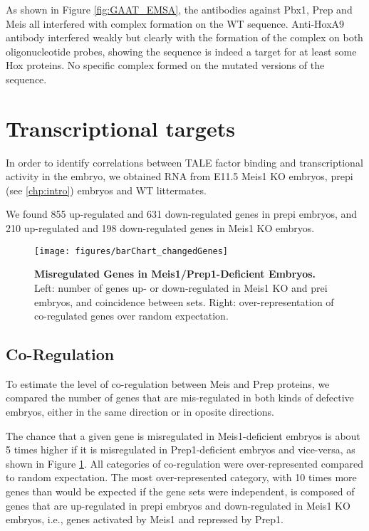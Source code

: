 As shown in Figure \ref{fig:GAAT_EMSA}, the antibodies against Pbx1, Prep and Meis all interfered with complex formation on the \ac{WT} sequence. Anti-HoxA9 antibody interfered weakly but clearly with the formation of the complex on both oligonucleotide probes, showing the sequence is indeed a target for at least some Hox proteins. No specific complex formed on the mutated versions of the sequence.

\section{Transcriptional targets}

In order to identify correlations between \ac{TALE} factor binding and transcriptional activity in the embryo, we obtained RNA from E11.5 Meis1 \ac{KO} embryos, \ac{prepi} (see \ref{chp:intro}) embryos and \ac{WT} littermates. 

We found 855 up-regulated and 631 down-regulated genes in \ac{prepi} embryos, and 210 up-regulated and 198 down-regulated genes in Meis1 \ac{KO} embryos. 

\begin{figure}[]
  \centering
  \texttt{[image: figures/barChart\_changedGenes]}
  \caption[Misregulated Genes in Meis1/Prep1-Deficient Embryos]{\textbf{Misregulated Genes in Meis1/Prep1-Deficient Embryos.} Left: number of genes up- or down-regulated in Meis1 \ac{KO} and \ac{prei} embryos, and coincidence between sets. Right: over-representation of co-regulated genes over random expectation.}
  \label{fig:changedGenes}
\end{figure}

\subsection{Co-Regulation}

To estimate the level of co-regulation between Meis and Prep proteins, we compared the number of genes that are mis-regulated in both kinds of defective embryos, either in the same direction or in oposite directions. 

The chance that a given gene is misregulated in Meis1-deficient embryos is about 5 times higher if it is misregulated in Prep1-deficient embryos and vice-versa, as shown in Figure \ref{fig:changedGenes}. All categories of co-regulation were over-represented compared to random expectation. The most over-represented category, with 10 times more genes than would be expected if the gene sets were independent, is composed of genes that are up-regulated in \ac{prepi} embryos and down-regulated in Meis1 \ac{KO} embryos, i.e., genes activated by Meis1 and repressed by Prep1.

